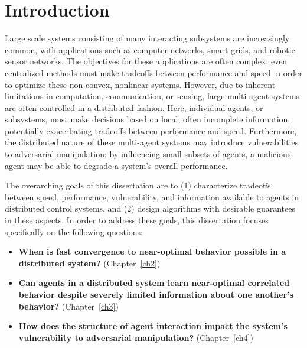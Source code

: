 \chapter{\Large Introduction}
\label{introchap}

Large scale systems consisting of many interacting subsystems are increasingly common, with applications such as computer networks, smart grids, and robotic sensor networks. The objectives for these applications are often complex; even centralized methods must make tradeoffs between performance and speed in order to optimize these non-convex, nonlinear systems. However, due to inherent limitations in computation, communication, or sensing, large multi-agent systems are often controlled in a distributed fashion. Here, individual agents, or subsystems, must make decisions based on local, often incomplete information, potentially exacerbating tradeoffs between performance and speed. Furthermore, the distributed nature of these multi-agent systems may introduce vulnerabilities to adversarial manipulation: by influencing small subsets of agents, a malicious agent may be able to degrade a system's overall performance.%

The overarching goals of this dissertation are to (1) characterize tradeoffs between speed, performance, vulnerability, and information available to agents in distributed control systems, and (2) design algorithms with desirable guarantees in these aspects. %
In order to address these goals, this dissertation focuses specifically on the following questions:


\begin{itemize}[leftmargin=*]
\item \textbf{When is fast convergence to near-optimal behavior possible in a distributed system?} (Chapter~\ref{ch2})
\item\textbf{Can agents in a distributed system learn near-optimal correlated behavior despite severely limited information about one another's behavior?} (Chapter~\ref{ch3})
\item\textbf{How does the structure of agent interaction impact the system's vulnerability to adversarial manipulation?} (Chapter~\ref{ch4})
\end{itemize}


